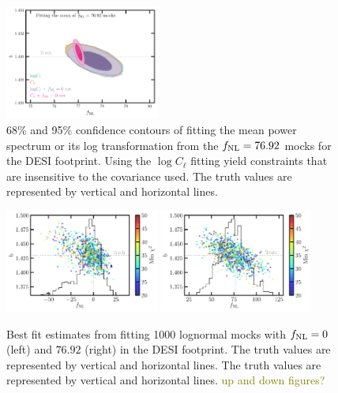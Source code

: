 \begin{figure}
    \centering
    \includegraphics[width=0.45\textwidth]{figures/mcmc_po100.pdf} 
    \caption{68\% and 95\% confidence contours of fitting the mean power spectrum or its log transformation from the $f_{\rm NL}=76.92$ mocks for the DESI footprint. Using the $\log C_{\ell}$ fitting yield constraints that are insensitive to the covariance used. The truth values are represented by vertical and horizontal lines.}\label{fig:mcmc_mocks100}
\end{figure}

\begin{figure}
    \centering
    \includegraphics[width=0.45\textwidth]{figures/bestfit_zero.pdf} 
    \includegraphics[width=0.45\textwidth]{figures/bestfit_po100.pdf}         
    \caption{Best fit estimates from fitting 1000 lognormal mocks with $f_{\rm NL}=0$ (left) and $76.92$ (right) in the DESI footprint. The truth values are represented by vertical and horizontal lines. The truth values are represented by vertical and horizontal lines. \textcolor{olive}{up and down figures?}}\label{fig:bestfit_mocks}
\end{figure}





